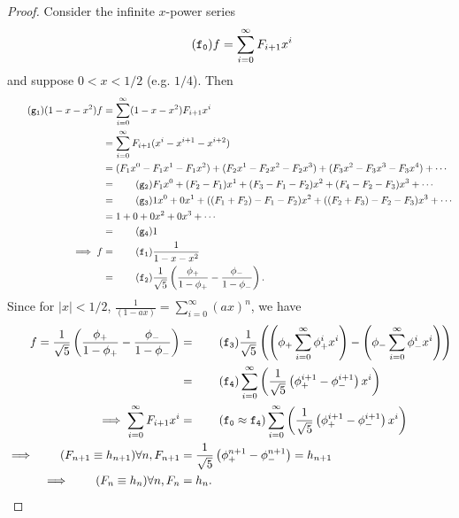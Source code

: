 \documentclass{article}
\begin{document}
\begin{proof}
Consider the infinite $x$-power series
\begin{align*}
\tag{\texttt{f\textsubscript{0}}}
  f = \sum_{i=0}^\infty F_{i+1} x^i
\end{align*}
and suppose $0 < x < 1/2$ (e.g. $1/4$).
Then
\begin{align*}
\tag{\texttt{g\textsubscript{1}}}
  (1 - x - x^2) f
&=
  \sum_{i=0}^\infty (1 - x - x^2) F_{i+1} x^i
\\&=
  \sum_{i=0}^\infty F_{i+1} (x^i - x^{i+1} - x^{i+2})
\\&=
  (F_1 x^0 - F_1 x^1 - F_1 x^2) +
  (F_2 x^1 - F_2 x^2 - F_2 x^3) +
  (F_3 x^2 - F_3 x^3 - F_3 x^4) + \cdots
\\&=
\tag{\texttt{g\textsubscript{2}}}
  F_1 x^0 +
  (F_2 - F_1) x^1 +
  (F_3 - F_1 - F_2) x^2 +
  (F_4 - F_2 - F_3) x^3 +
  \cdots
\\&=
\tag{\texttt{g\textsubscript{3}}}
  1 x^0 +
  0 x^1 +
  ((F_1 + F_2) - F_1 - F_2) x^2 +
  ((F_2 + F_3) - F_2 - F_3) x^3 +
  \cdots
\\&=
  1 +
  0 +
  0 x^2 +
  0 x^3 +
  \cdots
\\&=
\tag{\texttt{g\textsubscript{4}}}
  1
\\\implies
  f
&=
\tag{\texttt{f\textsubscript{1}}}
  \frac{1}{1 - x - x^2}
\\&=
\tag{\texttt{f\textsubscript{2}}}
  \frac{1}{\sqrt{5}} \left(
    \frac{\phi_+}{1 - \phi_+} -
    \frac{\phi_-}{1 - \phi_-}
  \right).
\end{align*}
Since for $|x| < 1/2$, $\frac{1}{(1 - a x)} = \sum_{i=0}^\infty (a x)^n$,
we have
\begin{align*}
  f
=
  \frac{1}{\sqrt{5}} \left(
    \frac{\phi_+}{1 - \phi_+} -
    \frac{\phi_-}{1 - \phi_-}
  \right)
&=
\tag{\texttt{f\textsubscript{3}}}
  \frac{1}{\sqrt{5}} \left(
    \left(\phi_+ \sum_{i=0}^\infty \phi_+^i x^i\right) -
    \left(\phi_-\sum_{i=0}^\infty \phi_-^i x^i\right)
  \right)
\\&=
\tag{\texttt{f\textsubscript{4}}}
  \sum_{i=0}^\infty \left(
    \frac{1}{\sqrt{5}} \left(\phi_+^{i+1} - \phi_-^{i+1}\right) x^i
  \right)
\\\implies
  \sum_{i=0}^\infty F_{i+1} x^i
&=
\tag{$\texttt{f\textsubscript{0}} \approx \texttt{f\textsubscript{4}}$}
  \sum_{i=0}^\infty \left(
    \frac{1}{\sqrt{5}} \left(\phi_+^{i+1} - \phi_-^{i+1}\right) x^i
  \right)
\\\implies
\tag{$F_{n+1} \equiv h_{n+1}$}
\forall n,
  F_{n+1}
&=
  \frac{1}{\sqrt{5}} \left(\phi_+^{n+1} - \phi_-^{n+1}\right)
=
  h_{n+1}
\\\implies
\tag{$F_{n} \equiv h_{n}$}
\forall n,
  F_n
&=
  h_n.
\end{align*}
\end{proof}
\end{document}
